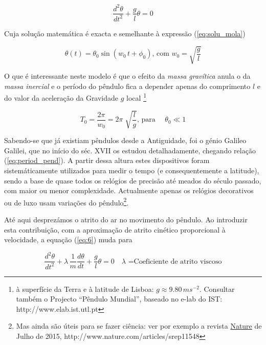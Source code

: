 \documentclass[a4paper,twoside,12pt]{article}      %
\begin{document}
\begin{equation}
	\label{eq:6} 
	 \frac{d^2 \theta}{dt^2} + \frac{g}{l} \theta =0
\end{equation}

Cuja solução matemática é exacta e semelhante à expressão (\ref{eq:solu_mola})

\begin{equation}
	\label{eq:solu_pend}
\theta (t) = \theta_0 \sin(w_0 \, t + \phi_0) \text{, com } w_0 = \sqrt{\frac{g}{l}}
\end{equation}

O que é interessante neste modelo é que o efeito da \emph{massa gravítica } anula o da \emph{massa inercial } e o período do pêndulo fica a  depender apenas do comprimento $l$  e do valor da aceleração da Gravidade $g$  local 
\footnote{à superfície da Terra e à latitude de Lisboa: $g\approx 9.80\,m s^{-2}$. Consultar também o Projecto ``Pêndulo Mundial'', baseado no e-lab do IST: http://www.elab.ist.utl.pt}

\begin{equation}
	\label{eq:period_pend}
T_0 = \frac{2 \pi}{w_0} = 2\pi\; \sqrt{\frac{l}{g}} \text{, para }	\quad \theta_0 \ll 1
\end{equation}

Sabendo-se que já existiam pêndulos  desde a Antiguidade, foi o génio  Galileo Galilei, que no início do séc. XVII os estudou detalhadamente, chegando relação (\ref{eq:period_pend}).
A partir dessa altura
estes dispositivos foram sistemáticamente utilizados para medir o tempo (e consequentemente a latitude), sendo a base 
de quase todos os relógios de precisão até meados do século passado, com maior ou menor complexidade.
Actualmente apenas os relógios decorativos ou de luxo usam  variações do pêndulo\footnote{Mas ainda são úteis para se fazer ciência: ver por exemplo a revista \href{http://www.nature.com/articles/srep11548}{Nature} de Julho de 2015, http://www.nature.com/articles/srep11548}.


Até aqui desprezámos o atrito do ar no movimento do pêndulo. Ao introduzir esta contribuição, com a aproximação de atrito cinético 
proporcional à velocidade, a  equação	(\ref{eq:6}) muda para

\begin{equation}
	 \frac{d^2 \theta}{dt^2} + \lambda \, \frac{1}{m}  \frac{d \theta}{dt} + \frac{g}{l} \theta =0 \quad \lambda \text{ =Coeficiente de atrito viscoso}
\end{equation}
\end{document}
